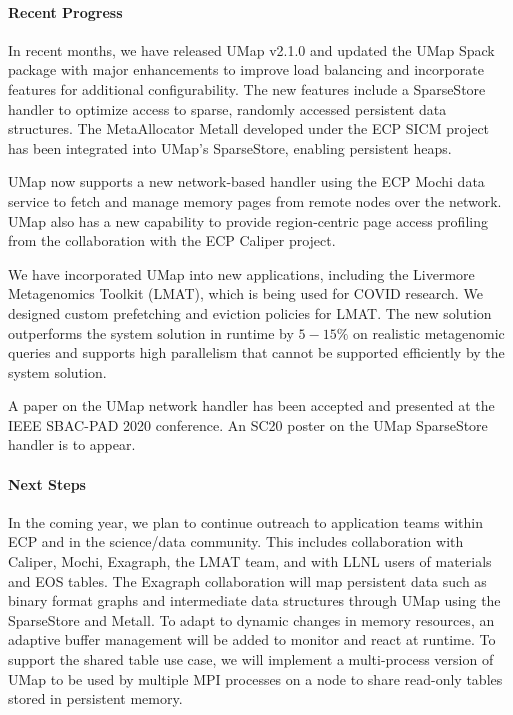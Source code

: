 \paragraph{Recent Progress}

In recent months, we have released UMap v2.1.0 and updated the UMap Spack package with major enhancements to improve load balancing and incorporate features for additional configurability. The new features include a SparseStore handler to optimize access to sparse, randomly accessed persistent data structures. The MetaAllocator Metall developed under the ECP SICM project has been integrated into UMap's SparseStore, enabling persistent heaps. 

UMap now supports a new network-based handler using the ECP Mochi data service to fetch and manage memory pages from remote nodes over the network. UMap also has a new capability to provide region-centric page access profiling from the collaboration with the ECP Caliper project. 

We have incorporated UMap into new applications, including the Livermore Metagenomics Toolkit (LMAT), which is being used for COVID research. We designed custom prefetching and eviction policies for LMAT.  The new solution outperforms the system solution in runtime by $5-15\%$ on realistic metagenomic queries and supports high parallelism that cannot be supported efficiently by the system solution. 

A paper on the UMap network handler has been accepted and presented at the IEEE SBAC-PAD 2020 conference. An SC20 poster on the UMap SparseStore handler is to appear.

\paragraph{Next Steps}
In the coming year, we plan to continue outreach to application teams
within ECP and in the science/data community. This includes
collaboration with Caliper, Mochi, Exagraph, the LMAT team, and
with LLNL users of materials and EOS tables. The Exagraph
collaboration will map persistent data such as binary format graphs
and intermediate data structures through UMap using the SparseStore
and Metall. To adapt to dynamic changes in memory resources, an adaptive buffer management will be added to monitor and react at runtime. To support the shared table use case, we will implement a multi-process version of UMap to be used by
multiple MPI processes on a node to share read-only tables stored in
persistent memory.

